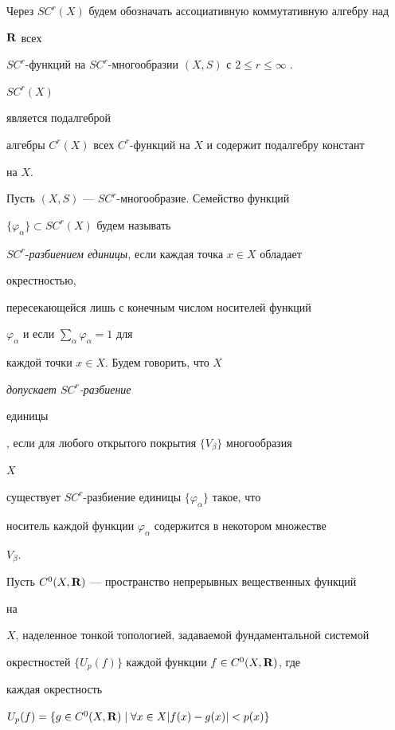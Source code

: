 Через $SC^r(X)$ будем обозначать ассоциативную коммутативную алгебру над


$\bold R$ всех


$SC^r$-функций на $SC^r$-многообразии $(X,S)$ с $2\le r\le\infty\;$.


$SC^r(X)$


является подалгеброй


алгебры $C^r(X)$ всех $C^r$-функций на $X$ и содержит подалгебру констант


на $X$.





\begin{defns}


Пусть $(X,S)$ --- $SC^r$-многообразие. Семейство функций


$\{\varphi_\alpha\}\subset SC^r(X)$ будем называть


$SC^r$-{\em разбиением единицы}, если каждая точка $x\in X$ обладает


окрестностью,


пересекающейся лишь с конечным числом носителей функций


$\varphi_\alpha$ и если $\sum_\alpha\varphi_\alpha=1$ для


каждой точки $x\in X$. Будем говорить, что $X$


{\em допускает $SC^r$-разбиение


единицы}, если для любого открытого покрытия $\{V_\beta\}$ многообразия


$X$


существует $SC^r$-разбиение единицы $\{\varphi_\alpha\}$ такое, что


носитель каждой функции $\varphi_\alpha$ содержится в некотором множестве


$V_\beta$.


\end{defns}





Пусть $C^0(X,\bold R)$ --- пространство непрерывных вещественных функций


на


$X$, наделенное тонкой топологией, задаваемой фундаментальной системой


окрестностей $\{U_p(f)\}$ каждой функции $f\in C^0(X,\bold R)$, где


каждая окрестность


$U_p(f)=\{g\in C^0(X,\bold R)\mid\forall x\in X|f(x)-g(x)|<p(x)\}$


